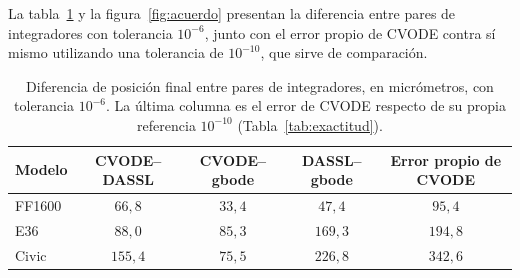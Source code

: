 


La tabla~\ref{tab:acuerdo} y la figura~\ref{fig:acuerdo} presentan la diferencia entre pares de integradores con tolerancia $10^{-6}$, junto con el error propio de CVODE contra sí mismo utilizando una tolerancia de $10^{-10}$, que sirve de comparación.

\begin{table}[H]
\centering
\begin{tabular}{lccc|c}
	\hline
	Modelo & CVODE--DASSL & CVODE--gbode & DASSL--gbode & Error propio de CVODE \\
	\hline
	FF1600 & $66{,}8$  & $33{,}4$ & $47{,}4$  & $95{,}4$  \\
	E36    & $88{,}0$  & $85{,}3$ & $169{,}3$ & $194{,}8$ \\
	Civic  & $155{,}4$ & $75{,}5$ & $226{,}8$ & $342{,}6$ \\
	\hline
\end{tabular}
\caption[Diferencia entre integradores]{Diferencia de posición final entre pares de integradores, en micrómetros, con tolerancia $10^{-6}$. La última columna es el error de CVODE respecto de su propia referencia $10^{-10}$ (Tabla~\ref{tab:exactitud}).}
\label{tab:acuerdo}
\end{table}

